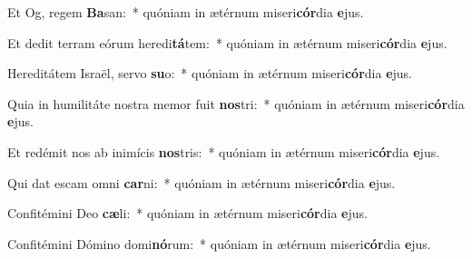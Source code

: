 \item Et Og, regem \textbf{Ba}san:~* quóniam in ætérnum miseri\textbf{cór}dia \textbf{e}jus.
\item Et dedit terram eórum heredi\textbf{tá}tem:~* quóniam in ætérnum miseri\textbf{cór}dia \textbf{e}jus.
\item Hereditátem Israël, servo \textbf{su}o:~* quóniam in ætérnum miseri\textbf{cór}dia \textbf{e}jus.
\item Quia in humilitáte nostra memor fuit \textbf{nos}tri:~* quóniam in ætérnum miseri\textbf{cór}dia \textbf{e}jus.
\item Et redémit nos ab inimícis \textbf{nos}tris:~* quóniam in ætérnum miseri\textbf{cór}dia \textbf{e}jus.
\item Qui dat escam omni \textbf{car}ni:~* quóniam in ætérnum miseri\textbf{cór}dia \textbf{e}jus.
\item Confitémini Deo \textbf{cæ}li:~* quóniam in ætérnum miseri\textbf{cór}dia \textbf{e}jus.
\item Confitémini Dómino domi\textbf{nó}rum:~* quóniam in ætérnum miseri\textbf{cór}dia \textbf{e}jus.
